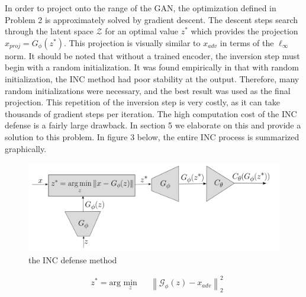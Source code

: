 \documentclass[twoside]{article}
\theoremstyle{definition}
\newcommand{\norm}[2]{\left\lVert #1 \right\rVert_{#2}}
\begin{document}
In order to project onto the range of the GAN, the optimization defined in Problem 2 is approximately solved by gradient descent. The descent steps search through the latent space $\mathcal{Z}$ for an optimal value $z^*$ which provides the projection $x_{proj} = G_{\phi}(z^*)$. This projection is visually similar to $x_{adv}$ in terms of the $\ell_\infty$ norm. It should be noted that without a trained encoder, the inversion step must begin with a random initialization. It was found empirically in \cite{ilyas2017} that with random initialization, the INC method had poor stability at the output. Therefore, many random initializations were necessary, and the best result was used as the final projection. This repetition of the inversion step is very costly, as it can take thousands of gradient steps per iteration. The high computation cost of the INC defense is a fairly large drawback. In section 5 we elaborate on this and provide a solution to this problem. In figure 3 below, the entire INC process is summarized graphically. 

\begin{figure}[H]
    \caption{the INC defense method}
    \centering
    \includegraphics[scale=0.25]{./INC_diagram.png}
\end{figure}

\begin{problem}
    \begin{equation*}
    \begin{aligned}
    & z^* = \text{arg } \underset{z}{\text{min}}
    & & \norm{\mathcal{G}_{\phi}(z)-x_{adv}}{2}^2 \\
    \end{aligned}
    \end{equation*}
\end{problem}


\newpage
\end{document}
